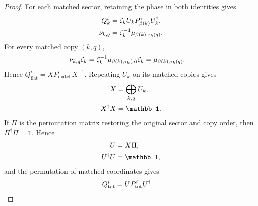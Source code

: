 \begin{proof}\leanok
    For each matched sector, retaining the phase in both identities gives
    \begin{align}
        Q_k^i
         & = \zeta_k U_kP_{\beta(k)}^iU_k^\dagger,
        \notag                                     \\
        \nu_{k,q}
         & = \zeta_k^{-1}\mu_{\beta(k),\tau_k(q)}.
        \notag
    \end{align}
    For every matched copy $(k,q)$,
    \begin{align}
        \nu_{k,q}\zeta_k
         & = \zeta_k^{-1}\mu_{\beta(k),\tau_k(q)}\zeta_k
        = \mu_{\beta(k),\tau_k(q)}.
        \notag
    \end{align}
    Hence $Q_{\mathrm{flat}}^i=XP_{\mathrm{match}}^iX^{-1}$. Repeating $U_k$
    on its matched copies gives
    \begin{align}
        X
         & = \bigoplus_{k,q}U_k,
        \notag                   \\
        X^\dagger X
         & = \mathbb 1.
        \notag
    \end{align}
    If $\Pi$ is the permutation matrix restoring the original sector and copy
    order, then $\Pi^\dagger\Pi=\mathbb 1$. Hence
    \begin{align}
        U
         & = X\Pi,
        \notag          \\
        U^\dagger U
         & = \mathbb 1,
        \notag
    \end{align}
    and the permutation of matched coordinates gives
    \begin{align}
        Q_{\mathrm{tot}}^i
         & = UP_{\mathrm{tot}}^iU^\dagger.
        \notag
    \end{align}
\end{proof}
